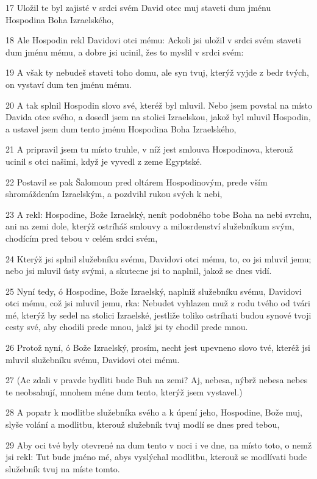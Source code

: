 \par 17 Uložil te byl zajisté v srdci svém David otec muj staveti dum jménu Hospodina Boha Izraelského,
\par 18 Ale Hospodin rekl Davidovi otci mému: Ackoli jsi uložil v srdci svém staveti dum jménu mému, a dobre jsi ucinil, žes to myslil v srdci svém:
\par 19 A však ty nebudeš staveti toho domu, ale syn tvuj, kterýž vyjde z bedr tvých, on vystaví dum ten jménu mému.
\par 20 A tak splnil Hospodin slovo své, kteréž byl mluvil. Nebo jsem povstal na místo Davida otce svého, a dosedl jsem na stolici Izraelskou, jakož byl mluvil Hospodin, a ustavel jsem dum tento jménu Hospodina Boha Izraelského,
\par 21 A pripravil jsem tu místo truhle, v níž jest smlouva Hospodinova, kterouž ucinil s otci našimi, když je vyvedl z zeme Egyptské.
\par 22 Postavil se pak Šalomoun pred oltárem Hospodinovým, prede vším shromáždením Izraelským, a pozdvihl rukou svých k nebi,
\par 23 A rekl: Hospodine, Bože Izraelský, nenít podobného tobe Boha na nebi svrchu, ani na zemi dole, kterýž ostríháš smlouvy a milosrdenství služebníkum svým, chodícím pred tebou v celém srdci svém,
\par 24 Kterýž jsi splnil služebníku svému, Davidovi otci mému, to, co jsi mluvil jemu; nebo jsi mluvil ústy svými, a skutecne jsi to naplnil, jakož se dnes vidí.
\par 25 Nyní tedy, ó Hospodine, Bože Izraelský, naplniž služebníku svému, Davidovi otci mému, což jsi mluvil jemu, rka: Nebudet vyhlazen muž z rodu tvého od tvári mé, kterýž by sedel na stolici Izraelské, jestliže toliko ostríhati budou synové tvoji cesty své, aby chodili prede mnou, jakž jsi ty chodil prede mnou.
\par 26 Protož nyní, ó Bože Izraelský, prosím, necht jest upevneno slovo tvé, kteréž jsi mluvil služebníku svému, Davidovi otci mému.
\par 27 (Ac zdali v pravde bydliti bude Buh na zemi? Aj, nebesa, nýbrž nebesa nebes te neobsahují, mnohem méne dum tento, kterýž jsem vystavel.)
\par 28 A popatr k modlitbe služebníka svého a k úpení jeho, Hospodine, Bože muj, slyše volání a modlitbu, kterouž služebník tvuj modlí se dnes pred tebou,
\par 29 Aby oci tvé byly otevrené na dum tento v noci i ve dne, na místo toto, o nemž jsi rekl: Tut bude jméno mé, abys vyslýchal modlitbu, kterouž se modlívati bude služebník tvuj na míste tomto.
